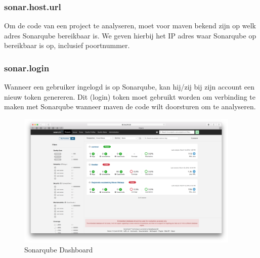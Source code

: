 \subsubsection{sonar.host.url}
Om de code van een project te analyseren, moet voor maven bekend zijn op welk adres Sonarqube bereikbaar is. We geven hierbij het IP adres waar Sonarqube op bereikbaar is op, inclusief poortnummer.
\subsubsection{sonar.login}
Wanneer een gebruiker ingelogd is op Sonarqube, kan hij/zij bij zijn account een nieuw token genereren. Dit (login) token moet gebruikt worden om verbinding te maken met Sonarqube wanneer maven de code wilt doorsturen om te analyseren.

\begin{figure}[H]
	\centering
	\includegraphics[width=0.95\textwidth]{img/SonarqubeDashboard.png}
	\caption{Sonarqube Dashboard}
	\label{fig:SonarqubeDashboard}
\end{figure}